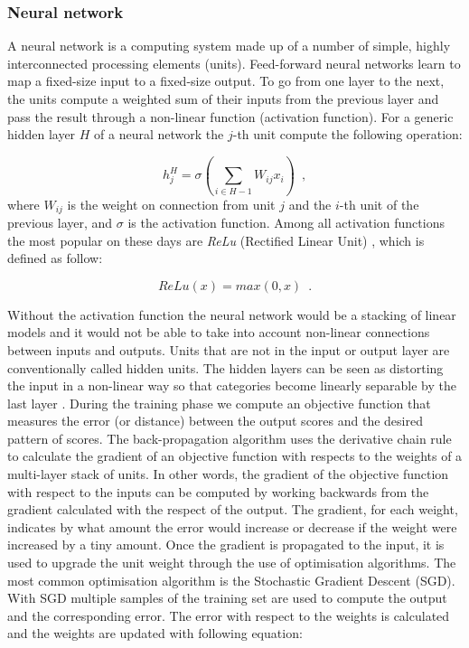\subsubsection{Neural network} \label{Neural network}

A neural network is a computing system made up of a number of simple, highly interconnected processing elements (units). Feed-forward neural networks learn to map a fixed-size input to a fixed-size output. To go from one layer to the next, the units compute a weighted sum of their inputs from the previous layer and pass the result through a non-linear function (activation function). For a generic hidden layer $H$ of a neural network the $j$-th unit compute the following operation:  

\begin{equation}
    h_j^H = \sigma(\sum_{i \in H-1}W_{ij}x_i)
    \enspace,
\end{equation}
where $W_{ij}$ is the weight on connection from unit $j$ and the $i$-th unit of the previous layer, and $\sigma$ is the activation function. Among all activation functions the most popular on these days are \textit{ReLu} (Rectified Linear Unit) \citep{Glorot2011DeepSR}, which is defined as follow:

\begin{equation}
    ReLu(x) = max(0,x)
    \enspace.
\end{equation}

Without the activation function the neural network would be a stacking of linear models and it would not be able to take into account non-linear connections between inputs and outputs. 
Units that are not in the input or output layer are conventionally called hidden units. The hidden layers can be seen as distorting the input in a non-linear way so that categories become linearly separable by the last layer \citep{DBLP:journals/nature/LeCunBH15}. During the training phase we compute an objective function that measures the error (or distance) between the output scores and the desired pattern of scores. The back-propagation algorithm uses the derivative chain rule to calculate the gradient of an objective function with respects to the weights of a multi-layer stack of units. In other words, the gradient of the objective function with respect to the inputs can be computed by working backwards from the gradient calculated with the respect of the output. The gradient, for each weight, indicates by what amount the error would increase or decrease if the weight were increased by a tiny amount. Once the gradient is propagated to the input, it is used to upgrade the unit weight through the use of optimisation algorithms. The most common optimisation algorithm is the Stochastic Gradient Descent (SGD). With SGD multiple samples of the training set are used to compute the output and the corresponding error. The error with respect to the weights is calculated and the weights are updated with following equation:

